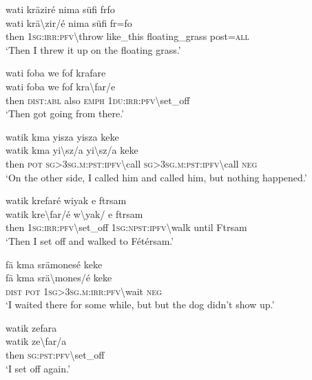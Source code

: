 \ea\label{ex:13:a1279}
wati kräziré nima süfi frfo\\
\gll wati	krä{\textbackslash}zir/é	nima	süfi	fr=fo\\
     then	1\textsc{sg}:\textsc{irr}:\textsc{pfv}{\textbackslash}throw	like\_this	floating\_grass	post=\textsc{all}\\
\glt `Then I threw it up on the floating grass.'
\z

\newpage
\ea\label{ex:13:a1280}
wati foba we fof krafare\\
\gll wati	foba	we	fof	kra{\textbackslash}far/e\\
     then	\textsc{dist}:\textsc{abl}	also	\textsc{emph}	1\textsc{du}:\textsc{irr}:\textsc{pfv}{\textbackslash}set\_off\\
\glt `Then got going from there.'
\z

\ea\label{ex:13:a1281}
watik kma yisza yisza keke\\
\gll watik	kma	yi{\textbackslash}sz/a	yi{\textbackslash}sz/a	keke\\
     then	\textsc{pot}	\textsc{sg}>3\textsc{sg}.\textsc{m}:\textsc{pst}:\textsc{ipfv}{\textbackslash}call	\textsc{sg}>3\textsc{sg}.\textsc{m}:\textsc{pst}:\textsc{ipfv}{\textbackslash}call	\textsc{neg}\\
\glt `On the other side, I called him and called him, but nothing happened.'
\z

\ea\label{ex:13:a1282}
watik krefaré wiyak e ftrsam\\
\gll watik	kre{\textbackslash}far/é	w{\textbackslash}yak/	e	ftrsam\\
     then	1\textsc{sg}:\textsc{irr}:\textsc{pfv}{\textbackslash}set\_off	1\textsc{sg}:\textsc{npst}:\textsc{ipfv}{\textbackslash}walk	until	Ftrsam\\
\glt `Then I set off and walked to Fétérsam.'
\z

\ea\label{ex:13:a1284}
fä kma srämonesé keke\\
\gll fä	kma	srä{\textbackslash}mones/é	keke\\
     \textsc{dist}	\textsc{pot}	1\textsc{sg}>3\textsc{sg}.\textsc{m}:\textsc{irr}:\textsc{pfv}{\textbackslash}wait	\textsc{neg}\\
\glt `I waited there for some while, but but the dog didn't show up.'
\z

\ea\label{ex:13:a1286}
watik zefara\\
\gll watik	ze{\textbackslash}far/a\\
     then	\textsc{sg}:\textsc{pst}:\textsc{pfv}{\textbackslash}set\_off\\
\glt `I set off again.'
\z

